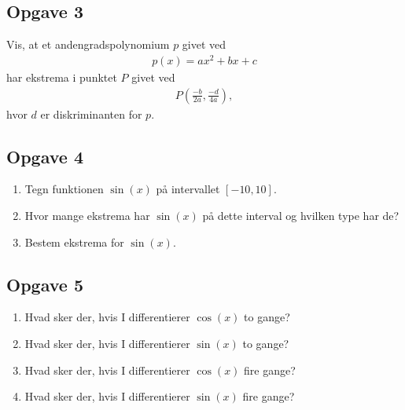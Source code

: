 \subsection*{Opgave 3}
Vis, at et andengradspolynomium $p$ givet ved
\begin{align*}
	p(x) = ax^2 + bx + c
\end{align*}
har ekstrema i punktet $P$ givet ved
\begin{align*}
	P\left(\frac{-b}{2a},\frac{-d}{4a}\right),
\end{align*}
hvor $d$ er diskriminanten for $p$. 
\subsection*{Opgave 4}
\begin{enumerate}[label=\roman*)]
	\item Tegn funktionen $\sin(x)$ på intervallet $[-10,10]$.
	\item Hvor mange ekstrema har $\sin(x)$ på dette interval og hvilken type har de?
	\item Bestem ekstrema for $\sin(x)$.
\end{enumerate}

\subsection*{Opgave 5}
\begin{enumerate}[label=\roman*)]
	\item Hvad sker der, hvis I differentierer $\cos(x)$ to gange?
	\item Hvad sker der, hvis I differentierer $\sin(x)$ to gange?
	\item Hvad sker der, hvis I differentierer $\cos(x)$ fire gange?
	\item Hvad sker der, hvis I differentierer $\sin(x)$ fire gange?
\end{enumerate}